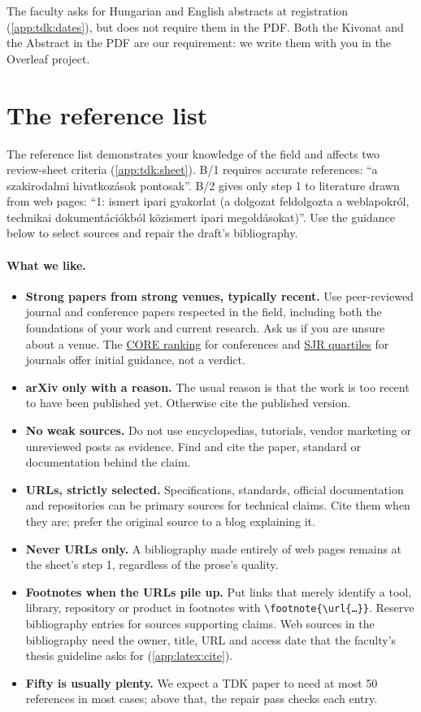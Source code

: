The faculty asks for Hungarian and English abstracts at registration (\cref{app:tdk:dates}), but does not require them in the PDF. Both the Kivonat and the Abstract in the PDF are our requirement: we write them with you in the Overleaf project.

\section{The reference list}\label{app:writing:refs}
The reference list demonstrates your knowledge of the field and affects two review-sheet criteria (\cref{app:tdk:sheet}). B/1 requires accurate references: \enquote{a szakirodalmi hivatkozások pontosak}. B/2 gives only step 1 to literature drawn from web pages: \enquote{1: ismert ipari gyakorlat (a dolgozat feldolgozta a weblapokról, technikai dokumentációkból közismert ipari megoldásokat)}. Use the guidance below to select sources and repair the draft's bibliography.

\paragraph{What we like.}
\begin{itemize}
  \item \textbf{Strong papers from strong venues, typically recent.} Use peer-reviewed journal and conference papers respected in the field, including both the foundations of your work and current research. Ask us if you are unsure about a venue. The \href{https://portal.core.edu.au/conf-ranks/}{CORE ranking} for conferences and \href{https://www.scimagojr.com/}{SJR quartiles} for journals offer initial guidance, not a verdict.
  \item \textbf{arXiv only with a reason.} The usual reason is that the work is too recent to have been published yet. Otherwise cite the published version.
  \item \textbf{No weak sources.} Do not use encyclopedias, tutorials, vendor marketing or unreviewed posts as evidence. Find and cite the paper, standard or documentation behind the claim.
  \item \textbf{URLs, strictly selected.} Specifications, standards, official documentation and repositories can be primary sources for technical claims. Cite them when they are; prefer the original source to a blog explaining it.
  \item \textbf{Never URLs only.} A bibliography made entirely of web pages remains at the sheet's step 1, regardless of the prose's quality.
  \item \textbf{Footnotes when the URLs pile up.} Put links that merely identify a tool, library, repository or product in footnotes with \texttt{\textbackslash footnote\{\textbackslash url\{\dots\}\}}. Reserve bibliography entries for sources supporting claims. Web sources in the bibliography need the owner, title, URL and access date that the faculty's thesis guideline asks for (\cref{app:latex:cite}).
  \item \textbf{Fifty is usually plenty.} We expect a TDK paper to need at most 50 references in most cases; above that, the repair pass checks each entry.
\end{itemize}


